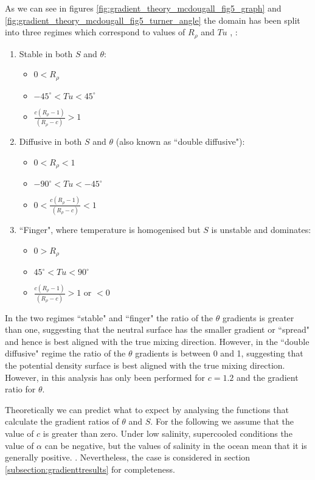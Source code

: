 As we can see in figures \ref{fig:gradient_theory_mcdougall_fig5_graph} and \ref{fig:gradient_theory_mcdougall_fig5_turner_angle} the domain has been split into three regimes which correspond to values of $R_\rho$ and $Tu$ \citep{McDougall1987}, \citep{YOU2002}: 

\begin{enumerate}
    \item Stable in both $S$ and $\theta$: 
        \begin{itemize}
            \item $0<R_\rho$
            \item $-45^{\circ}<Tu<45^{\circ}$
            \item $\frac{c(R_\rho - 1)}{(R_\rho - c)} > 1$
        \end{itemize}
    \item Diffusive in both $S$ and $\theta$ (also known as ``double diffusive"): 
        \begin{itemize}
            \item $0<R_\rho<1$
            \item $-90^{\circ}<Tu<-45^{\circ}$
            \item $0<\frac{c(R_\rho - 1)}{(R_\rho - c)} <1$
        \end{itemize}
    \item ``Finger", where temperature is homogenised but $S$ is unstable and dominates: 
        \begin{itemize}
            \item $0>R_\rho$
            \item $45^{\circ}<Tu<90^{\circ}$
            \item $\frac{c(R_\rho - 1)}{(R_\rho - c)} >1$ or $<0$ 
        \end{itemize}
\end{enumerate}

In the two regimes ``stable" and ``finger" the ratio of the $\theta$ gradients is greater than one, suggesting that the neutral surface has the smaller gradient or ``spread" and hence is best aligned with the true mixing direction. However, in the ``double diffusive" regime the ratio of the $\theta$ gradients is between 0 and 1, suggesting that the potential density surface is best aligned with the true mixing direction. However, in \citet{McDougall1987} this analysis has only been performed for $c = 1.2$ and the gradient ratio for $\theta$. 

Theoretically we can predict what to expect by analysing the functions that calculate the gradient ratios of $\theta$ and $S$. For the following we assume that the value of $c$ is greater than zero. Under low salinity, supercooled conditions the value of $\alpha$ can be negative, but the values of salinity in the ocean mean that it is generally positive. \citep{Sverdrup1942}. Nevertheless, the case is considered in section \ref{subsection:gradienttresults} for completeness.

